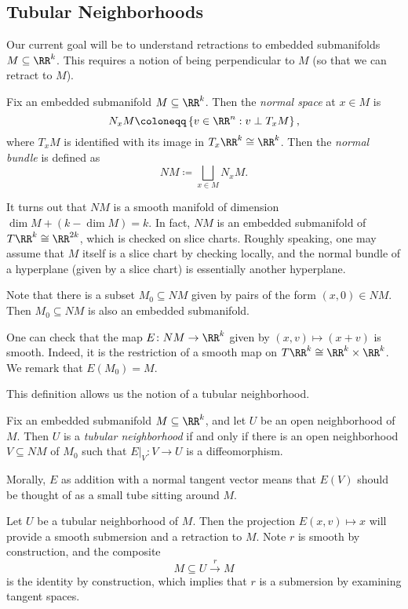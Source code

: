 \documentclass[../notes.tex]{subfiles}
\begin{document}
\subsection{Tubular Neighborhoods}
Our current goal will be to understand retractions to embedded submanifolds $M\subseteq\RR^k$. This requires a notion of being perpendicular to $M$ (so that we can retract to $M$).
\begin{definition}
	Fix an embedded submanifold $M\subseteq\RR^k$. Then the \textit{normal space} at $x\in M$ is
	\[N_xM\coloneqq\left\{v\in\RR^n:v\perp T_xM\right\},\]
	where $T_xM$ is identified with its image in $T_x\RR^k\cong\RR^k$. Then the \textit{normal bundle} is defined as
	\[NM\coloneqq\bigsqcup_{x\in M}N_xM.\]
\end{definition}
\begin{remark}
	It turns out that $NM$ is a smooth manifold of dimension $\dim M+(k-\dim M)=k$. In fact, $NM$ is an embedded submanifold of $T\RR^k\cong\RR^{2k}$, which is checked on slice charts. Roughly speaking, one may assume that $M$ itself is a slice chart by checking locally, and the normal bundle of a hyperplane (given by a slice chart) is essentially another hyperplane.
\end{remark}
\begin{remark}
	Note that there is a subset $M_0\subseteq NM$ given by pairs of the form $(x,0)\in NM$. Then $M_0\subseteq NM$ is also an embedded submanifold.
\end{remark}
\begin{remark}
	One can check that the map $E\colon NM\to\RR^k$ given by $(x,v)\mapsto(x+v)$ is smooth. Indeed, it is the restriction of a smooth map on $T\RR^k\cong\RR^k\times\RR^k$. We remark that $E(M_0)=M$.
\end{remark}
This definition allows us the notion of a tubular neighborhood.
\begin{definition}
	Fix an embedded submanifold $M\subseteq\RR^k$, and let $U$ be an open neighborhood of $M$. Then $U$ is a \textit{tubular neighborhood} if and only if there is an open neighborhood $V\subseteq NM$ of $M_0$ such that $E|_V\colon V\to U$ is a diffeomorphism.
\end{definition}
Morally, $E$ as addition with a normal tangent vector means that $E(V)$ should be thought of as a small tube sitting around $M$.
\begin{remark} \label{rem:smooth-retraction-tubular}
	Let $U$ be a tubular neighborhood of $M$. Then the projection $E(x,v)\mapsto x$ will provide a smooth submersion and a retraction to $M$. Note $r$ is smooth by construction, and the composite
	\[M\subseteq U\stackrel r\to M\]
	is the identity by construction, which implies that $r$ is a submersion by examining tangent spaces.
\end{remark}
\end{document}
